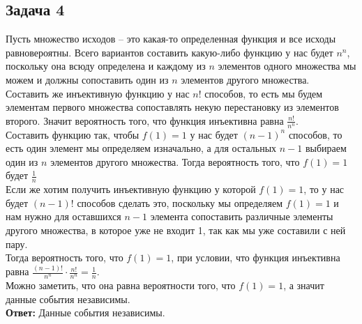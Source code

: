 	\subsection{Задача 4}
	Пусть множество исходов -- это какая-то определенная функция и все исходы равновероятны. 
	Всего вариантов составить какую-либо функцию у нас будет $n^n$, поскольку она всюду определена и каждому из $n$ элементов одного множества мы можем и должны сопоставить один из $n$ элементов другого множества.\\
	Составить же инъективную функцию у нас $n!$ способов, то есть мы будем элементам первого множества сопоставлять некую перестановку из элементов второго. Значит вероятность того, что функция инъективна равна $\frac{n!}{n^n}$.  \\
	Составить функцию так, чтобы $f(1) = 1$ у нас будет $(n-1)^n$ способов, то есть один элемент мы определяем изначально, а для остальных $n-1$ выбираем один из $n$ элементов другого множества. Тогда вероятность того, что $f(1) = 1$ будет $\frac{1}{n}$\\
	Если же хотим получить инъективную функцию у которой $f(1) = 1$, то у нас будет $(n-1)!$ способов сделать это, поскольку мы определяем $f(1) = 1$  и нам нужно для оставшихся $n-1$ элемента сопоставить различные элементы другого множества, в которое уже не входит 1, так как мы уже составили с ней пару. \\
	Тогда вероятность того, что $f(1) = 1$, при условии, что функция инъективна равна $\frac{(n-1)!}{n^n} \cdot \frac{n!}{n^n} = \frac{1}{n}$. \\
	Можно заметить, что она равна вероятности того, что $f(1) = 1$, а значит данные события независимы. \\
	\textbf{Ответ:} Данные события независимы.
	
